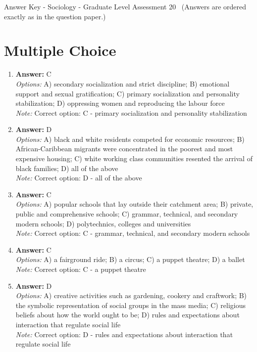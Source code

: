 \documentclass[12pt]{article}
\begin{document}
\begin{center}
Answer Key - Sociology - Graduate Level Assessment 20 \
\small (Answers are ordered exactly as in the question paper.)
\end{center}

\section*{Multiple Choice}
\begin{enumerate}[label=\arabic*.]
\item \textbf{Answer:} C
\\ \textit{Options:} A) secondary socialization and strict discipline; B) emotional support and sexual gratification; C) primary socialization and personality stabilization; D) oppressing women and reproducing the labour force
\\ \textit{Note:} Correct option: C - primary socialization and personality stabilization
\item \textbf{Answer:} D
\\ \textit{Options:} A) black and white residents competed for economic resources; B) African-Caribbean migrants were concentrated in the poorest and most expensive housing; C) white working class communities resented the arrival of black families; D) all of the above
\\ \textit{Note:} Correct option: D - all of the above
\item \textbf{Answer:} C
\\ \textit{Options:} A) popular schools that lay outside their catchment area; B) private, public and comprehensive schools; C) grammar, technical, and secondary modern schools; D) polytechnics, colleges and universities
\\ \textit{Note:} Correct option: C - grammar, technical, and secondary modern schools
\item \textbf{Answer:} C
\\ \textit{Options:} A) a fairground ride; B) a circus; C) a puppet theatre; D) a ballet
\\ \textit{Note:} Correct option: C - a puppet theatre
\item \textbf{Answer:} D
\\ \textit{Options:} A) creative activities such as gardening, cookery and craftwork; B) the symbolic representation of social groups in the mass media; C) religious beliefs about how the world ought to be; D) rules and expectations about interaction that regulate social life
\\ \textit{Note:} Correct option: D - rules and expectations about interaction that regulate social life
\end{enumerate}
\end{document}

